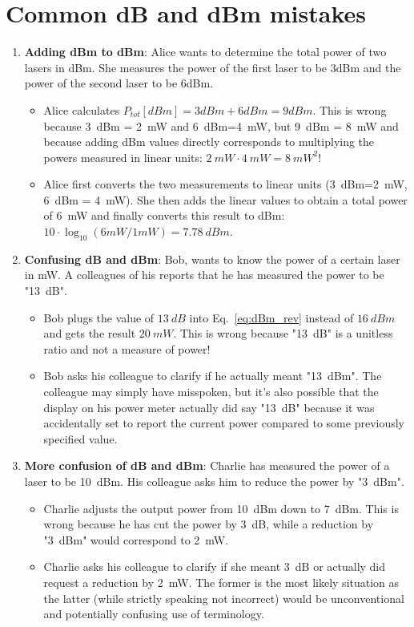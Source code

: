 \section{Common dB and dBm mistakes}

\begin{enumerate}
    \item \textbf{Adding dBm to dBm}: Alice wants to determine the total power of two lasers in dBm. She measures the power of the first laser to be 3dBm and the power of the second laser to be 6dBm.  
    \begin{itemize}
    \item[\redcross] Alice calculates $P_{tot} [dBm] = 3dBm + 6dBm = 9dBm$. This is wrong because 3~dBm = 2~mW and 6~dBm=4~mW, but 9~dBm = 8~mW and because adding dBm values directly corresponds to multiplying the powers measured in linear units: $2~mW\cdot4~mW = 8~mW^2$!
    \item[\greencheck] Alice first converts the two measurements to linear units (3~dBm=2~mW, 6~dBm = 4~mW). She then adds the linear values to obtain a total power of 6~mW and finally converts this result to dBm: $10\cdot\log_{10}(6mW/1mW)=7.78~dBm$.
    \end{itemize}

    \item \textbf{Confusing dB and dBm}: Bob, wants to know the power of a certain laser in mW. A colleagues of his reports that he has measured the power to be "13~dB".   
    \begin{itemize}
    \item[\redcross] Bob plugs the value of $13~dB$ into Eq.~\ref{eq:dBm_rev} instead of $16~dBm$ and gets the result $20~mW$. This is wrong because "13~dB" is a unitless ratio and not a measure of power!   
    \item[\greencheck] Bob asks his colleague to clarify if he actually meant "13~dBm". The colleague may simply have misspoken, but it's also possible that the display on his power meter actually did say "13~dB" because it was accidentally set to report the current power compared to some previously specified value.
    \end{itemize}

   \item \textbf{More confusion of dB and dBm}: Charlie has measured the power of a laser to be 10~dBm. His colleague asks him to reduce the power by "3~dBm".    
    \begin{itemize}
    \item[\redcross] Charlie adjusts the output power from 10~dBm down to 7~dBm. This is wrong because he has cut the power by 3~dB, while a reduction by "3~dBm" would correspond to 2~mW.  
    \item[\greencheck] Charlie asks his colleague to clarify if she meant 3~dB or actually did request a reduction by 2~mW. The former is the most likely situation as the latter (while strictly speaking not incorrect) would be unconventional and potentially confusing use of terminology.  
    \end{itemize}
    

\end{enumerate}
